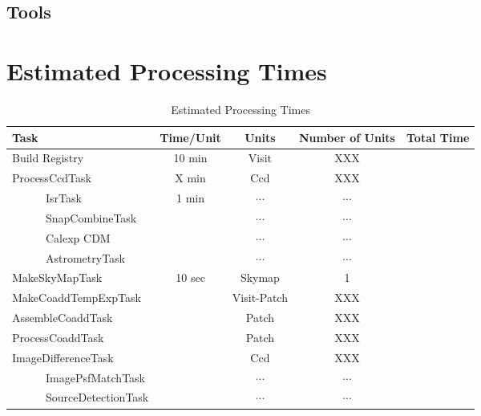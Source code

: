 \documentclass[12pt]{article}
\begin{document}
\subsection{Tools}


\clearpage 
\section{Estimated Processing Times} 

\begin{table*}[h]
\small
\begin{center}
\caption{\label{tab-pars} Estimated Processing Times}
\begin{tabular}{lcccc}
\hline \hline
Task                          & Time/Unit     & Units        & Number of Units & Total Time\\
\hline
Build Registry                & 10 min        & Visit        & XXX             &           \\ 
ProcessCcdTask                & X min         & Ccd          & XXX             &           \\ %
~~~~~~IsrTask                 & 1 min         & $\cdots$     & $\cdots$        &           \\
~~~~~~SnapCombineTask         &               & $\cdots$     & $\cdots$        &           \\
~~~~~~Calexp CDM              &               & $\cdots$     & $\cdots$        &           \\
~~~~~~AstrometryTask          &               & $\cdots$     & $\cdots$        &           \\
MakeSkyMapTask                & 10 sec        & Skymap       & 1               &           \\
MakeCoaddTempExpTask          &               & Visit-Patch  & XXX             &           \\
AssembleCoaddTask             &               & Patch        & XXX             &           \\   
ProcessCoaddTask              &               & Patch        & XXX             &           \\
ImageDifferenceTask           &               & Ccd          & XXX             &           \\
~~~~~~ImagePsfMatchTask       &               & $\cdots$     & $\cdots$        &           \\
~~~~~~SourceDetectionTask     &               & $\cdots$     & $\cdots$        &           \\

\end{tabular}
\end{center}
\end{table*}
\end{document}

